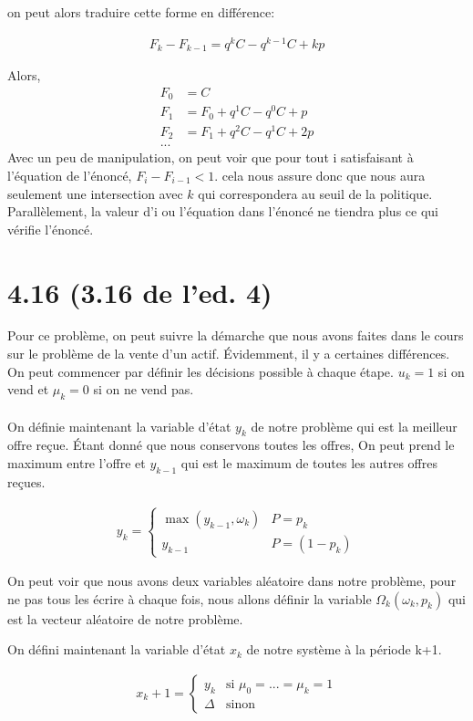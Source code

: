\documentclass[oneside]{book}
\begin{document}
on peut alors traduire cette forme en différence:

\begin{align*}
F_{k} - F_{k-1} = q^kC - q^{k-1}C + kp 
\end{align*}

Alors,
\begin{align*}
F_0 &= C\\
F_1 &= F_0 + q^1C - q^0C + p\\
F_2 &= F_1 + q^2C - q^1C + 2p\\
...
\end{align*}
Avec un peu de manipulation, on peut voir que pour tout i satisfaisant à l'équation de l'énoncé, $F_i - F_{i-1} < 1$. cela nous assure donc que nous aura seulement une intersection avec $k$ qui correspondera au seuil de la politique. Parallèlement, la valeur d'i ou l'équation dans l'énoncé ne tiendra plus ce qui vérifie l'énoncé.

\section*{4.16 (3.16 de l'ed. 4)}
Pour ce problème, on peut suivre la démarche que nous avons faites dans le cours sur le problème de la vente d'un actif. Évidemment, il y a certaines différences. On peut commencer par définir les décisions possible à chaque étape. $u_k = 1$ si on vend et $\mu_k = 0$ si on ne vend pas. \\\\
On définie maintenant la variable d'état $y_k$ de notre problème qui est la meilleur offre reçue. Étant donné que nous conservons toutes les offres, On peut prend le maximum entre l'offre et $y_{k-1}$ qui est le maximum de toutes les autres offres reçues.

\begin{gather*}
y_k = 
\begin{cases}
\max(y_{k-1}, \omega_k) & P = p_k\\
y_{k-1} & P = (1-p_k)
\end{cases}
\end{gather*}

On peut voir que nous avons deux variables aléatoire dans notre problème, pour ne pas tous les écrire à chaque fois, nous allons définir la variable $\Omega_k(\omega_k, p_k)$ qui est la vecteur aléatoire de notre problème.

On défini maintenant la variable d'état $x_k$ de notre système à la période k+1.

\begin{gather*}
x_k+1 = 
\begin{cases}
y_k &\text{si  } \mu_0 = ... = \mu_k = 1 \\
\Delta &\text{sinon}
\end{cases}
\end{gather*}
\end{document}
